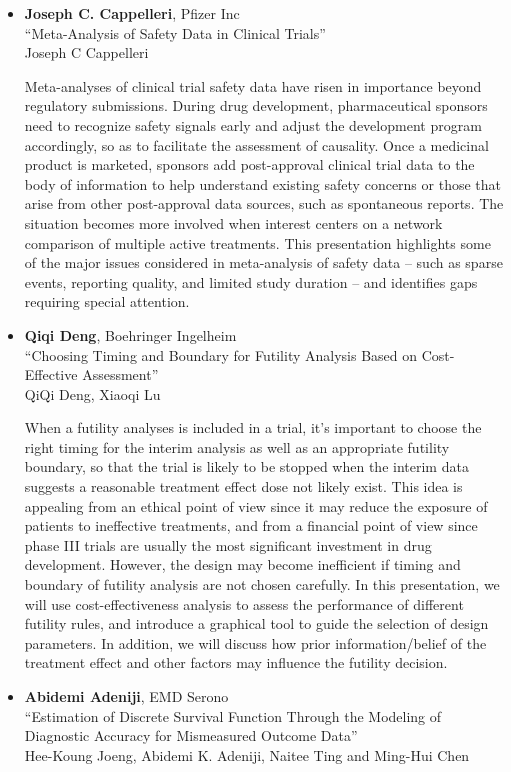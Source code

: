 \begin{itemize}
\item \textbf{Joseph C. Cappelleri}, Pfizer Inc \\
``Meta-Analysis of Safety Data in Clinical Trials'' \\
Joseph C Cappelleri


Meta-analyses of clinical trial safety data have risen in importance beyond regulatory submissions. During drug development, pharmaceutical sponsors need to recognize safety signals early and adjust the development program accordingly, so as to facilitate the assessment of causality. Once a medicinal product is marketed, sponsors add post-approval clinical trial data to the body of information to help understand existing safety concerns or those that arise from other post-approval data sources, such as spontaneous reports. The situation becomes more involved when interest centers on a network comparison of multiple active treatments.  This presentation highlights some of the major issues considered in meta-analysis of safety data – such as sparse events, reporting quality, and limited study duration – and identifies gaps requiring special attention.   

\item \textbf{Qiqi Deng}, Boehringer Ingelheim \\
``Choosing Timing and Boundary for Futility Analysis Based on Cost-Effective Assessment'' \\
QiQi Deng, Xiaoqi Lu


When a futility analyses is included in a trial, it’s important to choose the right timing for the interim analysis as well as an appropriate futility boundary, so that the trial is likely to be stopped when the interim data suggests a reasonable treatment effect dose not likely exist. This idea is appealing from an ethical point of view since it may reduce the exposure of patients to ineffective treatments, and from a financial point of view since phase III trials are usually the most significant investment in drug development. However, the design may become inefficient if timing and boundary of futility analysis are not chosen carefully. In this presentation, we will use cost-effectiveness analysis to assess the performance of different futility rules, and introduce a graphical tool to guide the selection of design parameters. In addition, we will discuss how prior information/belief of the treatment effect and other factors may influence the futility decision.

\item \textbf{Abidemi Adeniji}, EMD Serono \\
``Estimation of Discrete Survival Function Through the Modeling of Diagnostic Accuracy for Mismeasured Outcome Data'' \\
Hee-Koung Joeng, Abidemi K. Adeniji, Naitee Ting and Ming-Hui Chen



\end{itemize}
